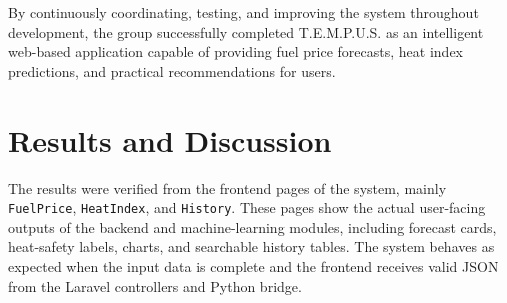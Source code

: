 \documentclass[12pt]{article}
\begin{document}
By continuously coordinating, testing, and improving the system throughout development, the group successfully completed T.E.M.P.U.S. as an intelligent web-based application capable of providing fuel price forecasts, heat index predictions, and practical recommendations for users.

\section{Results and Discussion}

The results were verified from the frontend pages of the system, mainly \texttt{FuelPrice}, \texttt{HeatIndex}, and \texttt{History}. These pages show the actual user-facing outputs of the backend and machine-learning modules, including forecast cards, heat-safety labels, charts, and searchable history tables. The system behaves as expected when the input data is complete and the frontend receives valid JSON from the Laravel controllers and Python bridge.
 
\end{document}
